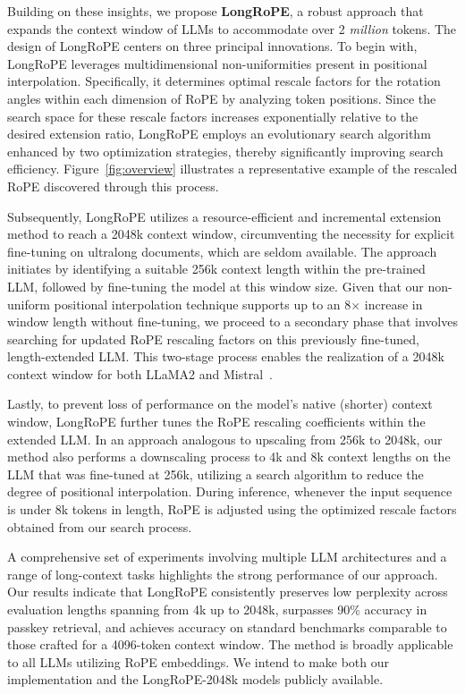 Building on these insights, we propose \textbf{LongRoPE}, a robust approach that expands the context window of LLMs to accommodate over 2 \emph{million} tokens. The design of LongRoPE centers on three principal innovations. To begin with, {LongRoPE} leverages multidimensional non-uniformities present in positional interpolation. Specifically, it determines optimal rescale factors for the rotation angles within each dimension of RoPE by analyzing token positions. Since the search space for these rescale factors increases exponentially relative to the desired extension ratio, {LongRoPE} employs an evolutionary search algorithm enhanced by two optimization strategies, thereby significantly improving search efficiency. Figure~\ref{fig:overview} illustrates a representative example of the rescaled RoPE discovered through this process.

Subsequently, {LongRoPE} utilizes a resource-efficient and incremental extension method to reach a 2048k context window, circumventing the necessity for explicit fine-tuning on ultralong documents, which are seldom available. The approach initiates by identifying a suitable 256k context length within the pre-trained LLM, followed by fine-tuning the model at this window size. Given that our non-uniform positional interpolation technique supports up to an 8$\times$ increase in window length without fine-tuning, we proceed to a secondary phase that involves searching for updated RoPE rescaling factors on this previously fine-tuned, length-extended LLM. This two-stage process enables the realization of a 2048k context window for both LLaMA2 and Mistral~\cite{mistral}.

Lastly, to prevent loss of performance on the model's native (shorter) context window, {LongRoPE} further tunes the RoPE rescaling coefficients within the extended LLM. In an approach analogous to upscaling from 256k to 2048k, our method also performs a downscaling process to 4k and 8k context lengths on the LLM that was fine-tuned at 256k, utilizing a search algorithm to reduce the degree of positional interpolation. During inference, whenever the input sequence is under 8k tokens in length, RoPE is adjusted using the optimized rescale factors obtained from our search process.

A comprehensive set of experiments involving multiple LLM architectures and a range of long-context tasks highlights the strong performance of our approach. Our results indicate that LongRoPE consistently preserves low perplexity across evaluation lengths spanning from 4k up to 2048k, surpasses 90\% accuracy in passkey retrieval, and achieves accuracy on standard benchmarks comparable to those crafted for a 4096-token context window. The method is broadly applicable to all LLMs utilizing RoPE embeddings. We intend to make both our implementation and the LongRoPE-2048k models publicly available.

